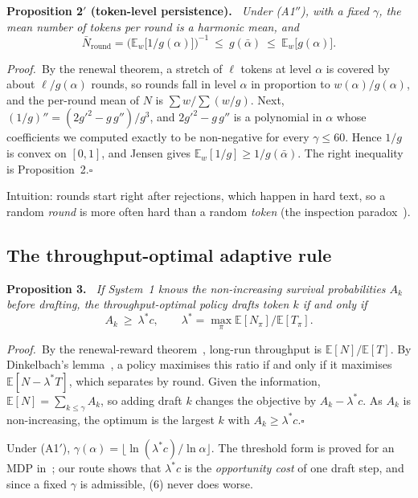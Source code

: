 \documentclass[11pt,letterpaper]{article}
\newenvironment{prop}[1]{\par\vspace{2pt}\noindent\textbf{Proposition #1.}\itshape\ }{\par\vspace{2pt}}
\newcommand{\pf}{\noindent\textit{Proof.}\ }
\newcommand{\qedbox}{\hfill$\square$}
\newcommand{\E}{\mathbb{E}}
\newcommand{\abar}{\bar\alpha}
\newcommand{\lstar}{\lambda^{*}}
\begin{document}
\begin{prop}{2$'$ (token-level persistence)}
Under (A1$''$), with a fixed $\gamma$, the mean number of tokens per round is a harmonic mean, and
\begin{equation}
\bar N_{\text{round}}=\Big(\E_w\big[1/g(\alpha)\big]\Big)^{-1}\ \le\ g(\abar)\ \le\ \E_w\big[g(\alpha)\big].
\end{equation}
\end{prop}
\pf By the renewal theorem, a stretch of $\ell$ tokens at level $\alpha$ is covered by about $\ell/g(\alpha)$ rounds, so rounds fall in level $\alpha$ in proportion to $w(\alpha)/g(\alpha)$, and the per-round mean of $N$ is $\sum w/\sum(w/g)$. Next, $(1/g)''=(2g'^2-g\,g'')/g^3$, and $2g'^2-g\,g''$ is a polynomial in $\alpha$ whose coefficients we computed exactly to be non-negative for every $\gamma\le60$. Hence $1/g$ is convex on $[0,1]$, and Jensen gives $\E_w[1/g]\ge1/g(\abar)$. The right inequality is Proposition~2.\qedbox

\smallskip
Intuition: rounds start right after rejections, which happen in hard text, so a random \emph{round} is more often hard than a random \emph{token} (the inspection paradox~\cite{ross}).

\subsection{The throughput-optimal adaptive rule}
\begin{prop}{3}
If System~1 knows the non-increasing survival probabilities $A_k$ before drafting, the throughput-optimal policy drafts token $k$ if and only if
\begin{equation}
A_k\ \ge\ \lstar c,\qquad \lstar=\max_\pi \E[N_\pi]/\E[T_\pi].
\end{equation}
\end{prop}
\pf By the renewal-reward theorem~\cite{ross}, long-run throughput is $\E[N]/\E[T]$. By Dinkelbach's lemma~\cite{dinkelbach}, a policy maximises this ratio if and only if it maximises $\E[N-\lstar T]$, which separates by round. Given the information, $\E[N]=\sum_{k\le\gamma}A_k$, so adding draft $k$ changes the objective by $A_k-\lstar c$. As $A_k$ is non-increasing, the optimum is the largest $k$ with $A_k\ge\lstar c$.\qedbox

\smallskip
Under (A1$'$), $\gamma(\alpha)=\lfloor\ln(\lstar c)/\ln\alpha\rfloor$. The threshold form is proved for an MDP in~\cite{specdecpp}; our route shows that $\lstar c$ is the \emph{opportunity cost} of one draft step, and since a fixed $\gamma$ is admissible, (6) never does worse.
\end{document}
